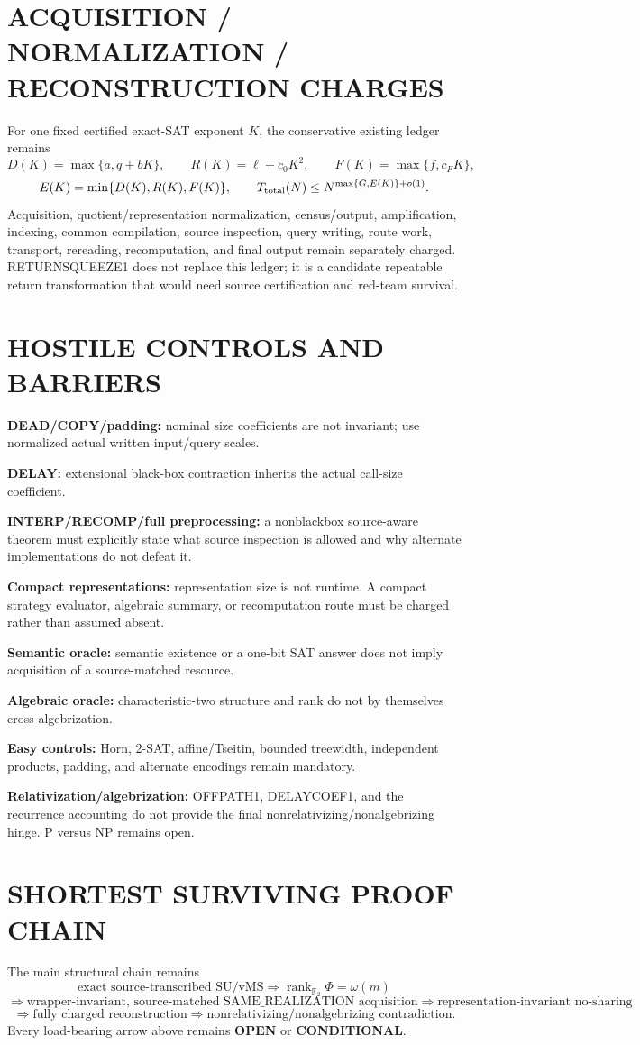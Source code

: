 \documentclass[11pt]{article}
\begin{document}
\section*{ACQUISITION / NORMALIZATION / RECONSTRUCTION CHARGES}
For one fixed certified exact-SAT exponent \(K\), the conservative existing ledger remains
\[
D(K)=\max\{a,q+bK\},\qquad
R(K)=\ell+c_0K^2,\qquad
F(K)=\max\{f,c_FK\},
\]
\[
E(K)=\min\{D(K),R(K),F(K)\},
\qquad
T_{\rm total}(N)\le N^{\max\{G,E(K)\}+o(1)}.
\]
Acquisition, quotient/representation normalization, census/output, amplification, indexing, common compilation, source inspection, query writing, route work, transport, rereading, recomputation, and final output remain separately charged. RETURNSQUEEZE1 does not replace this ledger; it is a candidate repeatable return transformation that would need source certification and red-team survival.

\section*{HOSTILE CONTROLS AND BARRIERS}
\textbf{DEAD/COPY/padding:} nominal size coefficients are not invariant; use normalized actual written input/query scales.

\textbf{DELAY:} extensional black-box contraction inherits the actual call-size coefficient.

\textbf{INTERP/RECOMP/full preprocessing:} a nonblackbox source-aware theorem must explicitly state what source inspection is allowed and why alternate implementations do not defeat it.

\textbf{Compact representations:} representation size is not runtime. A compact strategy evaluator, algebraic summary, or recomputation route must be charged rather than assumed absent.

\textbf{Semantic oracle:} semantic existence or a one-bit SAT answer does not imply acquisition of a source-matched resource.

\textbf{Algebraic oracle:} characteristic-two structure and rank do not by themselves cross algebrization.

\textbf{Easy controls:} Horn, 2-SAT, affine/Tseitin, bounded treewidth, independent products, padding, and alternate encodings remain mandatory.

\textbf{Relativization/algebrization:} OFFPATH1, DELAYCOEF1, and the recurrence accounting do not provide the final nonrelativizing/nonalgebrizing hinge. P versus NP remains open.

\section*{SHORTEST SURVIVING PROOF CHAIN}
The main structural chain remains
\[
\text{exact source-transcribed SU/vMS}
\Longrightarrow
\operatorname{rank}_{\mathbb F_2}\Phi=\omega(m)
\]
\[
\Longrightarrow
\boxed{\text{wrapper-invariant, source-matched SAME\_REALIZATION acquisition}}
\Longrightarrow
\text{representation-invariant no-sharing}
\]
\[
\Longrightarrow
\text{fully charged reconstruction}
\Longrightarrow
\text{nonrelativizing/nonalgebrizing contradiction}.
\]
Every load-bearing arrow above remains \textbf{OPEN} or \textbf{CONDITIONAL}.
\end{document}
